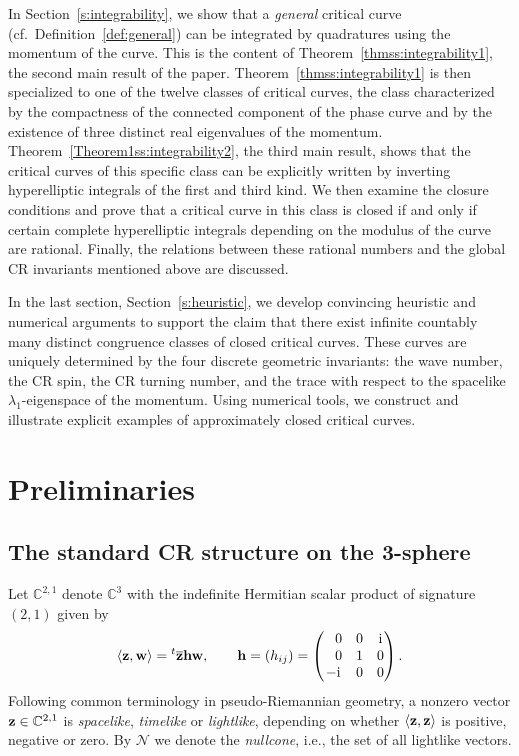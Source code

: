 \documentclass[10pt,a4paper]{amsart}
\numberwithin{equation}{section}
\def\C{\mathbb{C}}
\begin{document}
In Section~\ref{s:integrability},
we show that a \textit{general} critical curve (cf.\ Definition~\ref{def:general})
can be integrated by quadratures using the momentum of the curve. This is the content
of Theorem~\ref{thmss:integrability1}, the second main result of the paper.
%
Theorem~\ref{thmss:integrability1} is then specialized
to one of the twelve classes of critical curves, the class characterized by the compactness of the
connected component of the phase
curve and by the existence of three distinct real
{eigenvalues} of the momentum.
Theorem~\ref{Theorem1ss:integrability2}, the third main result,
shows that the critical curves of this specific class can be explicitly written by inverting hyperelliptic integrals
of the first and third kind.
%
We then examine the closure conditions and prove that a critical curve in this class is closed if and only if certain
complete hyperelliptic integrals depending on the {modulus} of the curve are rational.
Finally, the relations between these rational numbers and the global CR invariants mentioned above
are discussed.


In the last section, Section~\ref{s:heuristic}, we develop
convincing heuristic and numerical arguments to support the claim that there exist
infinite countably many distinct congruence classes of closed critical curves.
%
These curves are uniquely determined by the four discrete geometric invariants: the wave number,
the CR spin, the CR turning number, and the trace
with respect to the spacelike $\lambda_1$-eigenspace of the momentum.
Using numerical tools, we construct and illustrate explicit examples of approximately closed critical curves.


\section{Preliminaries}\label{s:preliminaries}

\subsection{The standard CR structure on the 3-sphere}%

Let $\C^{2,1}$ denote $\C^3$ with the indefinite Hermitian scalar product of signature $(2,1)$ given by
\begin{equation}\label{hp}
\langle \mathbf{z},\mathbf{w} \rangle
= {^t \overline{\mathbf{z}}} \mathbf{h} \mathbf{w},
\qquad {\mathbf h}= (h_{ij})=
\begin{pmatrix}
\hphantom{-}0& 0& {\rm i}\\
\hphantom{-}0& 1&0\\
-{\rm i}&0&0
\end{pmatrix}.
 \end{equation}
%
Following common terminology in pseudo-Riemannian geometry, a nonzero vector ${\bf z}\in\C^{2,1}$
is \emph{spacelike}, \emph{timelike} or \emph{lightlike}, depending on whether $\langle {\bf z}, {\bf z}\rangle$
is positive, negative or zero.
By $\mathcal{N}$ we denote the \textit{nullcone}, i.e., the set of all lightlike vectors.
\end{document}
